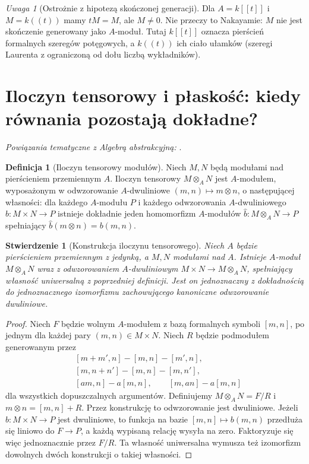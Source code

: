 \documentclass[11pt,a4paper,openany]{report}
\numberwithin{equation}{section}
\theoremstyle{plain}
\newtheorem{stwierdzenie}[twierdzenie]{Stwierdzenie}
\theoremstyle{definition}
\newtheorem{definicja}[twierdzenie]{Definicja}
\theoremstyle{remark}
\newtheorem{uwaga}[twierdzenie]{Uwaga}
\begin{document}
\begin{uwaga}[Ostrożnie z hipotezą skończonej generacji]
Dla $A=k[[t]]$ i $M=k((t))$ mamy $tM=M$,
ale $M\ne0$. Nie przeczy to Nakayamie: $M$
nie jest skończenie generowany jako $A$-moduł.
Tutaj $k[[t]]$ oznacza pierścień formalnych
szeregów potęgowych, a $k((t))$ ich ciało ułamków
(szeregi Laurenta z ograniczoną od dołu liczbą wykładników).
\end{uwaga}

\section{Iloczyn tensorowy i płaskość: kiedy równania pozostają dokładne?}
\label{sec:flatness}

\noindent\emph{Powiązania tematyczne z Algebrą abstrakcyjną:} .


\begin{definicja}[Iloczyn tensorowy modułów]
Niech $M,N$ będą modułami nad pierścieniem przemiennym $A$.
Iloczyn tensorowy $M\otimes_A N$ jest $A$-modułem,
wyposażonym w odwzorowanie $A$-dwuliniowe
$(m,n)\mapsto m\otimes n$, o następującej własności:
dla każdego $A$-modułu $P$ i każdego odwzorowania
$A$-dwuliniowego $b:M\times N\to P$ istnieje dokładnie
jeden homomorfizm $A$-modułów
$\widehat b:M\otimes_A N\to P$ spełniający
$\widehat b(m\otimes n)=b(m,n)$.
\end{definicja}

\begin{stwierdzenie}[Konstrukcja iloczynu tensorowego]
Niech $A$ będzie pierścieniem przemiennym z jedynką, a $M,N$
modułami nad $A$. Istnieje $A$-moduł $M\otimes_A N$
wraz z odwzorowaniem $A$-dwuliniowym
$M\times N\to M\otimes_A N$, spełniający własność
uniwersalną z poprzedniej definicji. Jest on jednoznaczny
z dokładnością do jednoznacznego izomorfizmu zachowującego
kanoniczne odwzorowanie dwuliniowe.
\end{stwierdzenie}
\begin{proof}
Niech $F$ będzie wolnym $A$-modułem z bazą
formalnych symboli $[m,n]$, po jednym dla każdej
pary $(m,n)\in M\times N$. Niech $R$ będzie
podmodułem generowanym przez
\[
\begin{aligned}
 &[m+m',n]-[m,n]-[m',n],\\
 &[m,n+n']-[m,n]-[m,n'],\\
 &[am,n]-a[m,n],\qquad [m,an]-a[m,n]
\end{aligned}
\]
dla wszystkich dopuszczalnych argumentów.
Definiujemy $M\otimes_A N=F/R$ i
$m\otimes n=[m,n]+R$. Przez konstrukcję
to odwzorowanie jest dwuliniowe.
Jeżeli $b:M\times N\to P$ jest dwuliniowe,
to funkcja na bazie $[m,n]\mapsto b(m,n)$
przedłuża się liniowo do $F\to P$, a każdą
wypisaną relację wysyła na zero.
Faktoryzuje się więc jednoznacznie przez $F/R$.
Ta własność uniwersalna wymusza też izomorfizm
dowolnych dwóch konstrukcji o takiej własności.
\end{proof}
\end{document}
